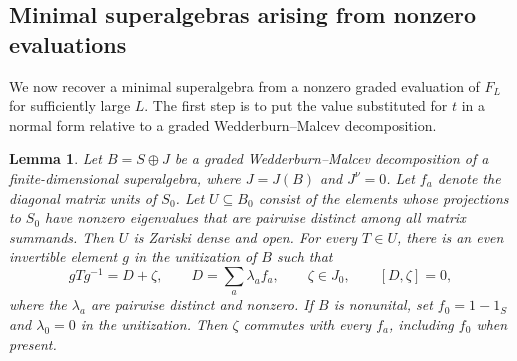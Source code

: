 \documentclass[11pt,reqno]{amsart}
\newtheorem{lemma}[theorem]{Lemma}
\theoremstyle{definition}
\theoremstyle{remark}
\numberwithin{equation}{section}
\begin{document}
\subsection{Minimal superalgebras arising from nonzero evaluations}\label{subsec:nonzero-evaluations}


We now recover a minimal superalgebra from a nonzero graded evaluation
of $F_L$ for sufficiently large $L$. 
The first step is to put the value
substituted for $t$ in a normal form relative to a graded
Wedderburn--Malcev decomposition.


\begin{lemma}\label{lem:diagonal-radical}
Let $B=S\oplus J$ be a graded Wedderburn--Malcev decomposition
of a finite-dimensional superalgebra, where $J=J(B)$ and
$J^\nu=0$.
Let $f_a$ denote the diagonal matrix units of $S_0$.
Let $U\subseteq B_0$ consist of the elements whose projections
to $S_0$ have nonzero eigenvalues that are pairwise distinct
among all matrix summands.
Then $U$ is Zariski dense and open.
For every $T\in U$, there is an even invertible element $g$
in the unitization of $B$ such that
\[
gTg^{-1}=D+\zeta,\qquad
D=\sum_a\lambda_a f_a,\qquad
\zeta\in J_0,\qquad [D,\zeta]=0,
\]
where the $\lambda_a$ are pairwise distinct and nonzero.
If $B$ is nonunital, set $f_0=1-1_S$ and $\lambda_0=0$
in the unitization.
Then $\zeta$ commutes with every $f_a$, including $f_0$
when present.
\end{lemma}
\end{document}
